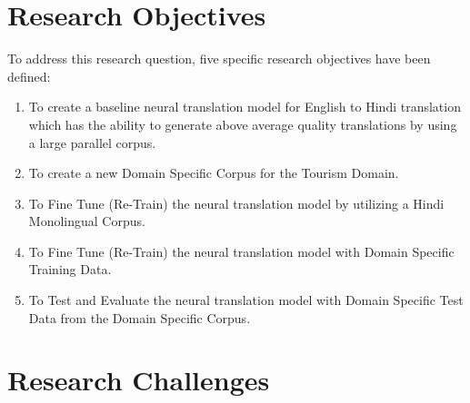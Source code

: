 \section{Research Objectives}
To address this research question, five specific research objectives have been defined:
\begin{enumerate}
    \item To create a baseline neural translation model for English to Hindi translation which has the ability to generate above average quality translations by using a large parallel corpus.
    \item To create a new Domain Specific Corpus for the Tourism Domain.
    \item To Fine Tune (Re-Train) the neural translation model by utilizing  a  Hindi Monolingual Corpus.
    \item To Fine Tune (Re-Train) the neural translation model with Domain Specific Training Data.
    \item To Test and Evaluate the neural translation model with Domain Specific Test Data from the Domain Specific Corpus.
\end{enumerate}
\section{Research Challenges}

